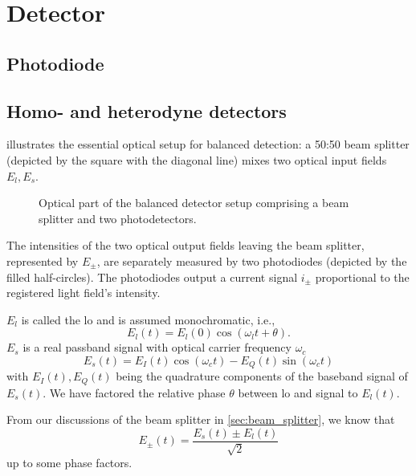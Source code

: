 \section{Detector}

\subsection{Photodiode}

\subsection{Homo- and heterodyne detectors}

 illustrates the essential optical setup for balanced detection:
a 50:50 beam splitter (depicted by the square with the diagonal line) mixes two optical input fields $E_l,E_s$.
\begin{figure}[htb]
    \centering
    
    \caption{Optical part of the balanced detector setup comprising a beam splitter and two photodetectors.}\label{fig:balanced_detector_optics}
\end{figure}
The intensities of the two optical output fields leaving the beam splitter, represented by $E_\pm$, are separately measured by two photodiodes (depicted by the filled half-circles).
The photodiodes output a current signal $i_\pm$ proportional to the registered light field's intensity.

$E_l$ is called the \gls{lo} and is assumed monochromatic, i.e.,
\begin{equation}
    E_l(t)
    =
    E_l(0)\cos(\omega_l t+\theta)
    \label{eq:efield_lo}.
\end{equation}
$E_s$ is a real passband signal with optical carrier frequency $\omega_c$
\begin{equation}
    E_s(t)
    =
    E_I(t)\cos(\omega_c t)-E_Q(t)\sin(\omega_c t)
    \label{eq:efield_signal}
\end{equation}
with $E_I(t),E_Q(t)$ being the quadrature components of the baseband signal of $E_s(t)$.
We have factored the relative phase $\theta$ between \gls{lo} and signal to $E_l(t)$.

From our discussions of the beam splitter in \cref{sec:beam_splitter}, we know that
\begin{equation}
    E_\pm(t)
    =
    \frac{E_s(t)\pm E_l(t)}{\sqrt{2}}
\end{equation}
up to some phase factors.

